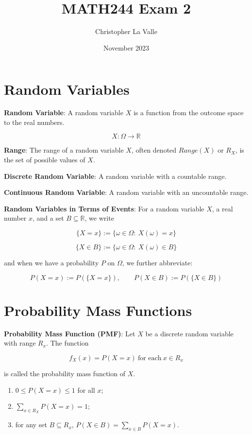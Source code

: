 \documentclass{article}
\title{MATH244 Exam 2}
\author{Christopher La Valle}
\date{November 2023}
\begin{document}
\maketitle

\tableofcontents

\section{Random Variables} 

\textbf{\color{blue}Random  Variable}: A random variable $X$ is a function from the outcome space to the real numbers.

$$X:\Omega\rightarrow\mathbb{R}$$

\noindent\textbf{\color{blue}Range}: The range of a random variable $X$, often denoted $Range(X)$ or $R_X$, is the set of possible values of $X$.

\noindent\textbf{\color{blue}Discrete Random Variable}: A random variable with a countable range.

\noindent\textbf{\color{blue}Continuous Random Variable}: A random variable with an uncountable range.

\noindent\textbf{\color{orange}Random Variables in Terms of Events}: For a random variable $X$, a real number $x$, and a set $B\subseteq\mathbb{R}$, we write

$$\{X=x\}:=\{\omega\in\Omega:\ X(\omega)=x\}$$

$$\{X\in B\}:=\{\omega\in\Omega:\ X(\omega)\in B\}$$

and when we have a probability $P$ on $\Omega$, we further abbreviate:

$$P(X=x):=P(\{X=x\}),\qquad P(X\in B):=P(\{X\in B\})$$

\section{Probability Mass Functions}


\noindent\textbf{\color{blue}Probability Mass Function (PMF)}: Let $X$ be a discrete random variable with range $R_x$. The function

$$f_X(x)=P(X=x)\ \text{for each}\ x\in R_x$$

\noindent is called the probability mass function of $X$.

\begin{enumerate}
    \item $0\le P(X=x)\le1$ for all $x$;
    \item $\underset{x\in R_X}{\sum}P(X=x)=1$;
    \item for any set $B\subseteq R_x$, $P(X\in B)=\underset{x\in B}{\sum}P(X=x)$.
\end{enumerate}
\end{document}
